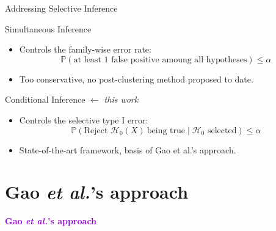 \documentclass{beamer}
\newcommand{\violet}[1]{\textcolor{darkviolet}{#1}}
\newcommand{\sectionslide}[1]{
  \begin{frame}[noframenumbering]{}
        \centering
        \vfill
        {\LARGE \violet{\textbf{#1}}}
        \vfill
    \end{frame}
}
\begin{document}
\begin{frame}{Addressing Selective Inference}

  \begin{block}{Simultaneous Inference}
\begin{itemize}
    \item Controls the family-wise error rate:
      \begin{equation*}\mathbb{P}(\text{at least 1 false positive amoung all hypotheses}) \leq \alpha\end{equation*}
    \item Too conservative, no post-clustering method proposed to date.
\end{itemize}
\end{block}
\vspace{1em}
\begin{block}{Conditional Inference \hfill {\color{black}$\leftarrow$ \textit{this work}}}
  \begin{itemize}
    \item Controls the selective type I error:
      \begin{equation*}\mathbb{P}\!\left(\text{Reject } \mathcal{H}_0(X) ~\text{being true} \mid \mathcal{H}_0 \text{ selected}\right) \leq \alpha\end{equation*}
    \item State-of-the-art framework, basis of Gao et al.'s approach.
  \end{itemize}
\end{block}

\end{frame}

\section{Gao \textit{et al.}'s approach}

\sectionslide{Gao \textit{et al.}'s approach}
\end{document}
